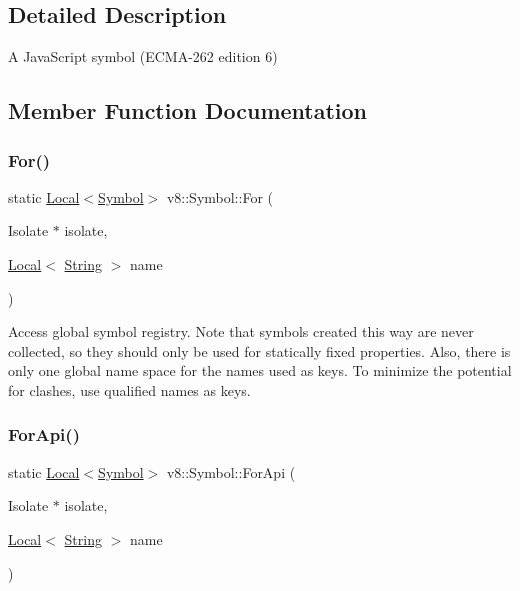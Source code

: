 \subsection{Detailed Description}
A Java\+Script symbol (E\+C\+M\+A-\/262 edition 6) 

\subsection{Member Function Documentation}
\mbox{\label{classv8_1_1Symbol_a8a4a6bdc7d3e31c71cf48fa5cb811fc8}} 
\subsubsection{\texorpdfstring{For()}{For()}}
{\footnotesize\ttfamily static \mbox{\hyperlink{classv8_1_1Local}{Local}}$<$\mbox{\hyperlink{classv8_1_1Symbol}{Symbol}}$>$ v8\+::\+Symbol\+::\+For (\begin{DoxyParamCaption}\item[{Isolate $\ast$}]{isolate,  }\item[{\mbox{\hyperlink{classv8_1_1Local}{Local}}$<$ \mbox{\hyperlink{classv8_1_1String}{String}} $>$}]{name }\end{DoxyParamCaption})\hspace{0.3cm}{\ttfamily [static]}}

Access global symbol registry. Note that symbols created this way are never collected, so they should only be used for statically fixed properties. Also, there is only one global name space for the names used as keys. To minimize the potential for clashes, use qualified names as keys. \mbox{\label{classv8_1_1Symbol_ac3937f0b0b831c4be495a399f26d7301}} 
\subsubsection{\texorpdfstring{For\+Api()}{ForApi()}}
{\footnotesize\ttfamily static \mbox{\hyperlink{classv8_1_1Local}{Local}}$<$\mbox{\hyperlink{classv8_1_1Symbol}{Symbol}}$>$ v8\+::\+Symbol\+::\+For\+Api (\begin{DoxyParamCaption}\item[{Isolate $\ast$}]{isolate,  }\item[{\mbox{\hyperlink{classv8_1_1Local}{Local}}$<$ \mbox{\hyperlink{classv8_1_1String}{String}} $>$}]{name }\end{DoxyParamCaption})\hspace{0.3cm}{\ttfamily [static]}}

